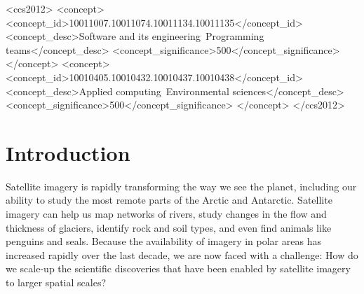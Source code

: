 \documentclass[manuscript,screen]{acmart}
\begin{document}
\begin{CCSXML}
	<ccs2012>
	<concept>
	<concept_id>10011007.10011074.10011134.10011135</concept_id>
	<concept_desc>Software and its engineering~Programming teams</concept_desc>
	<concept_significance>500</concept_significance>
	</concept>
	<concept>
	<concept_id>10010405.10010432.10010437.10010438</concept_id>
	<concept_desc>Applied computing~Environmental sciences</concept_desc>
	<concept_significance>500</concept_significance>
	</concept>
	</ccs2012>
\end{CCSXML}



\maketitle

\section{Introduction}
Satellite imagery is rapidly transforming the way we see the planet, including our ability to study the most remote parts of the Arctic and Antarctic. Satellite imagery can help us map networks of rivers, study changes in the flow and thickness of glaciers, identify rock and soil types, and even find animals like penguins and seals. Because the availability of imagery in polar areas has increased rapidly over the last decade, we are now faced with a challenge: How do we scale-up the scientific discoveries that have been enabled by satellite imagery to larger spatial scales?
\end{document}
